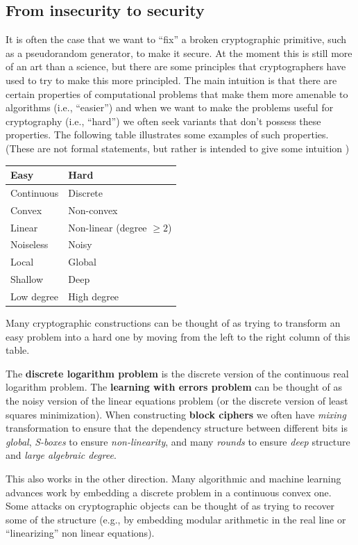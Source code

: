 \subsection{From insecurity to security}\label{3-From-insecurity-to-sec}

It is often the case that we want to ``fix'' a broken cryptographic
primitive, such as a pseudorandom generator, to make it secure. At the
moment this is still more of an art than a science, but there are some
principles that cryptographers have used to try to make this more
principled. The main intuition is that there are certain properties of
computational problems that make them more amenable to algorithms (i.e.,
``easier'') and when we want to make the problems useful for
cryptography (i.e., ``hard'') we often seek variants that don't possess
these properties. The following table illustrates some examples of such
properties. (These are not formal statements, but rather is intended to
give some intuition )

\begin{longtable}[]{@{}ll@{}}
\toprule
Easy & Hard\tabularnewline
\midrule
\endhead
Continuous & Discrete\tabularnewline
Convex & Non-convex\tabularnewline
Linear & Non-linear (degree \(\geq 2\))\tabularnewline
Noiseless & Noisy\tabularnewline
Local & Global\tabularnewline
Shallow & Deep\tabularnewline
Low degree & High degree\tabularnewline
\bottomrule
\end{longtable}

Many cryptographic constructions can be thought of as trying to
transform an easy problem into a hard one by moving from the left to the
right column of this table.

The \textbf{discrete logarithm problem} is the discrete version of the
continuous real logarithm problem. The \textbf{learning with errors
problem} can be thought of as the noisy version of the linear equations
problem (or the discrete version of least squares minimization). When
constructing \textbf{block ciphers} we often have \emph{mixing}
transformation to ensure that the dependency structure between different
bits is \emph{global}, \emph{S-boxes} to ensure \emph{non-linearity},
and many \emph{rounds} to ensure \emph{deep} structure and \emph{large
algebraic degree}.

This also works in the other direction. Many algorithmic and machine
learning advances work by embedding a discrete problem in a continuous
convex one. Some attacks on cryptographic objects can be thought of as
trying to recover some of the structure (e.g., by embedding modular
arithmetic in the real line or ``linearizing'' non linear equations).

